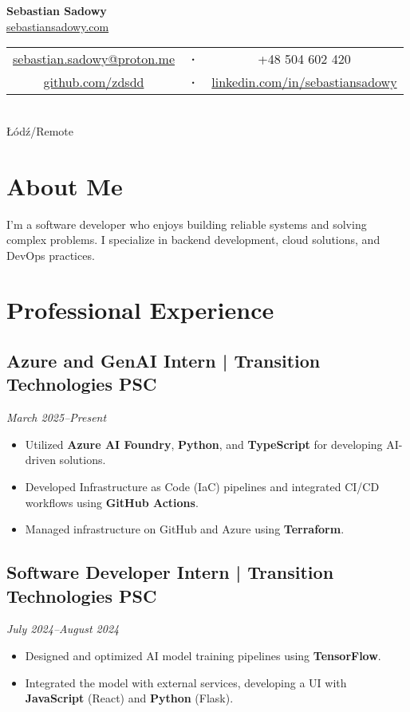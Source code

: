 \documentclass[a4paper,10pt]{article}
\begin{document}
\begin{center}
    {\Huge\textbf{Sebastian Sadowy}} \\[0.3cm]
    \href{https://sebastiansadowy.com}{sebastiansadowy.com} \\[0.2cm]
    \begin{tabular}{c c c}
        \href{mailto:sebastian.sadowy@proton.me}{sebastian.sadowy@proton.me} &
        \textbf{·} &
        +48 504 602 420 \\
        \href{https://github.com/zdsdd}{github.com/zdsdd} &
        \textbf{·} &
        \href{https://www.linkedin.com/in/sebastiansadowy}{linkedin.com/in/sebastiansadowy}
    \end{tabular} \\
    Łódź/Remote
\end{center}

\section{About Me}
I'm a software developer who enjoys building reliable systems and solving complex problems. I specialize in backend development, cloud solutions, and DevOps practices.

\section{Professional Experience}

\subsection{Azure and GenAI Intern | Transition Technologies PSC}
\textit{March 2025--Present}
\begin{itemize}[leftmargin=0.5cm, nosep]
    \item Utilized \textbf{Azure AI Foundry}, \textbf{Python}, and \textbf{TypeScript} for developing AI-driven solutions.
    \item Developed Infrastructure as Code (IaC) pipelines and integrated CI/CD workflows using \textbf{GitHub Actions}.
    \item Managed infrastructure on GitHub and Azure using \textbf{Terraform}.
\end{itemize}

\subsection{Software Developer Intern | Transition Technologies PSC}
\textit{July 2024--August 2024}
\begin{itemize}[leftmargin=0.5cm, nosep]
    \item Designed and optimized AI model training pipelines using \textbf{TensorFlow}.
    \item Integrated the model with external services, developing a UI with \textbf{JavaScript} (React) and \textbf{Python} (Flask).
\end{itemize}
\end{document}
